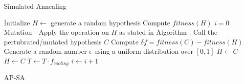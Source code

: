 \documentclass{beamer}
\begin{document}
            \begin{frame}[t]{Simulated Annealing}
                \fontsize{8}{8}\selectfont
                \begin{algorithm}[H]
                    Initialize $H\leftarrow$ generate a random hypothesis \;
                    Compute $fitness(H)$  \;
                    $i=0$ \;
                     {
                        Mutation - Apply the operation on $H$ as stated in Algorithm . Call the pertubrated/mutated hypothesis $C$ \;
                        Compute $\delta f = fitness(C) -fitness(H) $ \;
                         {
                            Generate a random number $\epsilon$ using a uniform distribution over $[0,1]$ \;
                             {
                                $H \leftarrow C$
                            }}  {
                            $H \leftarrow C$ \; }
                            $T \leftarrow T \cdot f_{cooling}$ \;
                            $i \leftarrow i + 1$ \;
                        } 
                        \caption{AP-SA}
                        \label{alg:ap-sa}
                    \end{algorithm}
                \end{frame}
\end{document}
